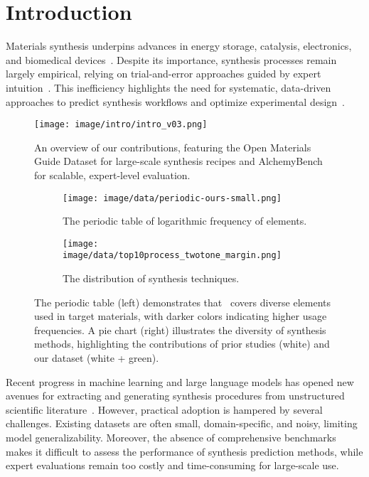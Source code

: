 \section{Introduction}
\label{sec:intro}

Materials synthesis underpins advances in energy storage, catalysis, electronics, and biomedical devices~\cite{olivetti2020data}. Despite its importance, synthesis processes remain largely empirical, relying on trial-and-error approaches guided by expert intuition~\cite{merchant2023scaling}. This inefficiency highlights the need for systematic, data-driven approaches to predict synthesis workflows and optimize experimental design~\cite{huang2023application}.

\begin{figure}[!ht]
    \centering
    \texttt{[image: image/intro/intro\_v03.png]}
    \caption{An overview of our contributions, featuring the Open Materials Guide Dataset for large-scale synthesis recipes and AlchemyBench for scalable, expert-level evaluation.}
    \label{fig:intro}
\end{figure}

\begin{figure*}[ht!]
    \begin{subfigure}{.48\textwidth}
    \centering
    \texttt{[image: image/data/periodic-ours-small.png]}
    \caption{The periodic table of logarithmic frequency of elements.}
    \label{fig:data-element-distribution}
    \end{subfigure}
    \hfill
    \begin{subfigure}{.48\textwidth}
    \centering
    \texttt{[image: image/data/top10process\_twotone\_margin.png]}
    \caption{The distribution of synthesis techniques.}
    \label{fig:periodic-inorganic}
    \end{subfigure}

    \caption{The periodic table (left) demonstrates that \oursdatashort~covers diverse elements used in target materials, with darker colors indicating higher usage frequencies. A pie chart (right) illustrates the diversity of synthesis methods, highlighting the contributions of prior studies (white) and our dataset (white + green).}
    \label{fig:periodic-all}
\end{figure*}

Recent progress in machine learning and large language models has opened new avenues for extracting and generating synthesis procedures from unstructured scientific literature~\cite{song2023matsci,dunn2020benchmarking}. However, practical adoption is hampered by several challenges. Existing datasets are often small, domain-specific, and noisy, limiting model generalizability. Moreover, the absence of comprehensive benchmarks makes it difficult to assess the performance of synthesis prediction methods, while expert evaluations remain too costly and time-consuming for large-scale use.

